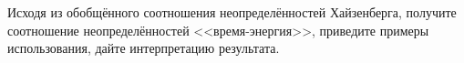 \documentclass[__main__.tex]{subfiles}
\begin{document}
Исходя из обобщённого соотношения неопределённостей Хайзенберга, получите соотношение неопределённостей <<время-энергия>>, приведите примеры использования, дайте интерпретацию результата.\\ 

\end{document}
